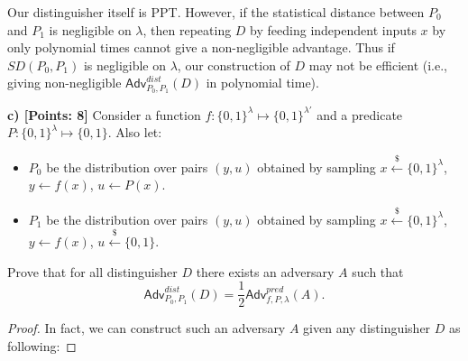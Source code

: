 \documentclass[12pt]{article}
\newcommand{\bits}{\{0,1\}}
\newcommand{\getsr}{\stackrel{\$}{\gets}}
\newcommand{\Adv}{\textsf{Adv}}
\theoremstyle{definition}
\begin{document}
Our distinguisher itself is PPT. However, if the statistical distance between $P_0$ and $P_1$ is negligible on $\lambda$, then repeating $D$ by feeding independent inputs $x$ by only polynomial times cannot give a non-negligible advantage. Thus if $SD(P_0,P_1)$ is negligible on $\lambda$, our construction of $D$ may not be efficient (i.e., giving non-negligible $\Adv_{P_0,P_1}^{dist}(D)$ in polynomial time).

{\bf c) [Points: 8]} Consider a function $f : \bits^\lambda \mapsto \bits^{\lambda'}$ and a predicate $P : \bits^\lambda \mapsto \bits$.
Also let:
\begin{itemize}
\item $P_0$ be the distribution over pairs $(y, u)$ obtained by sampling $x\getsr\bits^\lambda$, $y\gets f(x)$, $u\gets P(x)$.
\item $P_1$ be the distribution over pairs $(y, u)$ obtained by sampling $x\getsr\bits^\lambda$, $y\gets f(x)$, $u\getsr \bits$.
\end{itemize}
Prove that for all distinguisher $D$ there exists an adversary $A$ such that
$$\Adv_{P_0,P_1}^{dist}(D) = \frac{1}{2}\Adv_{f,P,\lambda}^{pred}(A).$$
\begin{proof}
In fact, we can construct such an adversary $A$ given any distinguisher $D$ as following:
\end{proof}
\end{document}
